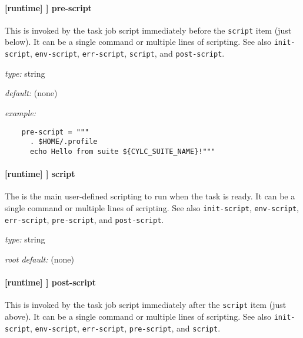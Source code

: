 \paragraph[pre-script]{ [runtime] \textrightarrow [[\_\_NAME\_\_]] \textrightarrow pre-script}

This is invoked by the task job script immediately before the \lstinline=script=
item (just below). It can be a single command or multiple lines of scripting.
See also \lstinline=init-script=, \lstinline=env-script=, \lstinline=err-script=,
\lstinline=script=, and \lstinline=post-script=.

\begin{myitemize}
\item {\em type:} string
\item {\em default:} (none)
\item {\em example:}
 \begin{lstlisting}
    pre-script = """
      . $HOME/.profile
      echo Hello from suite ${CYLC_SUITE_NAME}!"""
 \end{lstlisting}
\end{myitemize}

\paragraph[script]{[runtime] \textrightarrow [[\_\_NAME\_\_]] \textrightarrow script}
\label{ScriptItem}

The is the main user-defined scripting to run when the task is ready. It can be a
single command or multiple lines of scripting. See also \lstinline=init-script=,
\lstinline=env-script=, \lstinline=err-script=, \lstinline=pre-script=, and
\lstinline=post-script=.

\begin{myitemize}
\item {\em type:} string
\item {\em root default:} (none)
\end{myitemize}

\paragraph[post-script]{ [runtime] \textrightarrow [[\_\_NAME\_\_]] \textrightarrow post-script}

This is invoked by the task job script immediately after the \lstinline=script=
item (just above).  It can be a single command or multiple lines of scripting.
See also
\lstinline=init-script=, \lstinline=env-script=, \lstinline=err-script=,
\lstinline=pre-script=, and \lstinline=script=.

